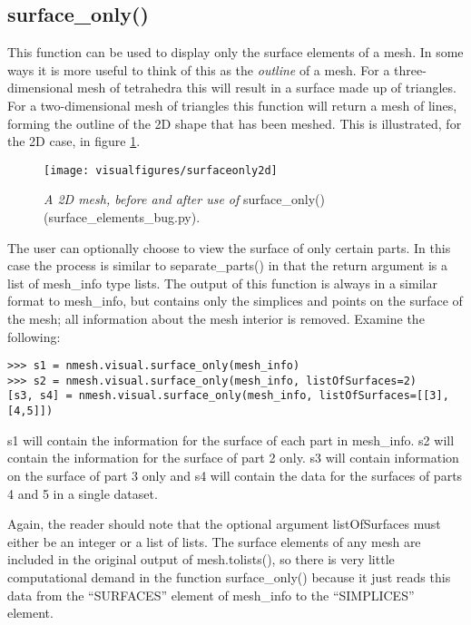 \subsection{{\ttfamily surface\_only()}}
This function can be used to display only the surface elements of a mesh. In some ways it is more useful to think of this as the {\em outline} of a mesh. For a three-dimensional mesh of tetrahedra this will result in a surface made up of triangles. For a two-dimensional mesh of triangles this function will return a mesh of lines, forming the outline of the 2D shape that has been meshed. This is illustrated, for the 2D case, in figure \ref{fig:surfaceonly2d}.

\begin{figure}
\begin{center}
\texttt{[image: visualfigures/surfaceonly2d]}
\caption{{\em A 2D mesh, before and after use of }{\ttfamily surface\_only() (surface\_elements\_bug.py)}. \label{fig:surfaceonly2d}}
\end{center}
\end{figure}

The user can optionally choose to view the surface of only certain parts. In this case the process is similar to {\ttfamily separate\_parts()} in that the return argument is a list of {\ttfamily mesh\_info} type lists. The output of this function is always in a similar format to {\ttfamily mesh\_info}, but contains only the simplices and points on the surface of the mesh; all information about the mesh interior is removed. Examine the following:

\begin{lstlisting}[basicstyle=\small\ttfamily]
>>> s1 = nmesh.visual.surface_only(mesh_info)
>>> s2 = nmesh.visual.surface_only(mesh_info, listOfSurfaces=2)
[s3, s4] = nmesh.visual.surface_only(mesh_info, listOfSurfaces=[[3],[4,5]])
\end{lstlisting}
{\ttfamily s1} will contain the information for the surface of each part in {\ttfamily mesh\_info}. {\ttfamily s2} will contain the information for the surface of part 2 only. {\ttfamily s3} will contain information on the surface of part 3 only and {\ttfamily s4} will contain the data for the surfaces of parts 4 and 5 in a single dataset.

Again, the reader should note that the optional argument {\ttfamily listOfSurfaces} must either be an integer or a list of lists. The surface elements of any mesh are included in the original output of {\ttfamily mesh.tolists()}, so there is very little computational demand in the function {\ttfamily surface\_only()} because it just reads this data from the {\ttfamily ``SURFACES''} element of {\ttfamily mesh\_info} to the {\ttfamily ``SIMPLICES''} element. 




